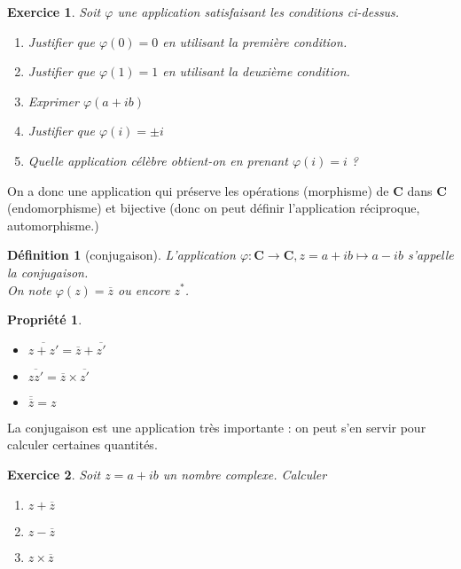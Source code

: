 \documentclass[11pt,a4paper,french]{article}
\newcommand{\C}{\mathbf{C}}
\theoremstyle{break}
\newtheorem{definition}{Définition}
\newtheorem{propriete}{Propriété}
\theoremstyle{plain}
\newtheorem{exerciceT}{Exercice}
\theoremstyle{nonumberplain}
\theoremstyle{nonumberbreak}
\newenvironment{exercice}{\begin{framed}\begin{exerciceT}}{\end{exerciceT}\end{framed}}
\begin{document}
\begin{exercice}
  Soit $\varphi$ une application satisfaisant les conditions ci-dessus.
  \begin{enumerate}
    \item Justifier que $\varphi(0) = 0$ en utilisant la première
      condition.
    \item Justifier que $\varphi(1) = 1$ en utilisant la deuxième
      condition.
    \item Exprimer $\varphi(a + ib)$
    \item Justifier que $\varphi(i) = \pm i$
    \item Quelle application célèbre obtient-on en prenant $\varphi(i) =
      i$ ?
  \end{enumerate}
\end{exercice}

On a donc une application qui préserve les opérations (morphisme) de
$\C$ dans $\C$ (endomorphisme) et bijective (donc on peut définir
l'application réciproque, automorphisme.)

\begin{definition}[conjugaison]
  L'application $\varphi \colon \C \to \C, z = a + ib \mapsto a - ib$
  s'appelle la conjugaison.\\ On note $\varphi(z) = \overline{z}$ ou
  encore $z^*$.
\end{definition}

\begin{propriete}
  \begin{itemize}
    \item $\overline{z + z'} = \overline{z} + \overline{z'}$
    \item $\overline{zz'} = \overline{z} \times \overline{z'}$
    \item $\overline{\overline{z}} = z$
  \end{itemize}
\end{propriete}

La conjugaison est une application très importante : on peut s'en servir
pour calculer certaines quantités.

\begin{exercice} Soit $z = a + ib$ un nombre complexe. Calculer
  \begin{enumerate}
    \item $z + \overline{z}$
    \item $z - \overline{z}$
    \item $z \times \overline{z}$
  \end{enumerate}
\end{exercice}
\end{document}
